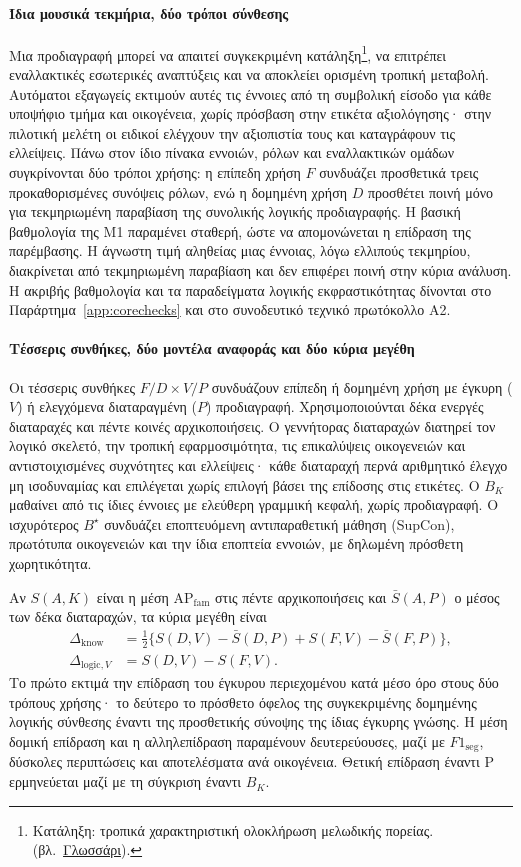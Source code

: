 \documentclass[a4paper]{article}
\newcommand{\musnote}[2]{\footnote{#2\enspace(βλ.~\hyperlink{gl:#1}{Γλωσσάρι}).}}
\begin{document}
\paragraph{Ίδια μουσικά τεκμήρια, δύο τρόποι σύνθεσης}
Μια προδιαγραφή μπορεί να απαιτεί συγκεκριμένη κατάληξη\musnote{cadence}{Κατάληξη: τροπικά χαρακτηριστική ολοκλήρωση μελωδικής πορείας.}, να επιτρέπει εναλλακτικές εσωτερικές αναπτύξεις και να αποκλείει ορισμένη τροπική μεταβολή. Αυτόματοι εξαγωγείς εκτιμούν αυτές τις έννοιες από τη συμβολική είσοδο για κάθε υποψήφιο τμήμα και οικογένεια, χωρίς πρόσβαση στην ετικέτα αξιολόγησης· στην πιλοτική μελέτη οι ειδικοί ελέγχουν την αξιοπιστία τους και καταγράφουν τις ελλείψεις. Πάνω στον ίδιο πίνακα εννοιών, ρόλων και εναλλακτικών ομάδων συγκρίνονται δύο τρόποι χρήσης: η επίπεδη χρήση $F$ συνδυάζει προσθετικά τρεις προκαθορισμένες συνόψεις ρόλων, ενώ η δομημένη χρήση $D$ προσθέτει ποινή μόνο για τεκμηριωμένη παραβίαση της συνολικής λογικής προδιαγραφής. Η βασική βαθμολογία της Μ1 παραμένει σταθερή, ώστε να απομονώνεται η επίδραση της παρέμβασης. Η άγνωστη τιμή αληθείας μιας έννοιας, λόγω ελλιπούς τεκμηρίου, διακρίνεται από τεκμηριωμένη παραβίαση και δεν επιφέρει ποινή στην κύρια ανάλυση. Η ακριβής βαθμολογία και τα παραδείγματα λογικής εκφραστικότητας δίνονται στο Παράρτημα~\ref{app:corechecks} και στο συνοδευτικό τεχνικό πρωτόκολλο Α2.

\paragraph{Τέσσερις συνθήκες, δύο μοντέλα αναφοράς και δύο κύρια μεγέθη}
Οι τέσσερις συνθήκες $F/D\times V/P$ συνδυάζουν επίπεδη ή δομημένη χρήση με έγκυρη ($V$) ή ελεγχόμενα διαταραγμένη ($P$) προδιαγραφή. Χρησιμοποιούνται δέκα ενεργές διαταραχές και πέντε κοινές αρχικοποιήσεις. Ο γεννήτορας διαταραχών διατηρεί τον λογικό σκελετό, την τροπική εφαρμοσιμότητα, τις επικαλύψεις οικογενειών και αντιστοιχισμένες συχνότητες και ελλείψεις· κάθε διαταραχή περνά αριθμητικό έλεγχο μη ισοδυναμίας και επιλέγεται χωρίς επιλογή βάσει της επίδοσης στις ετικέτες. Ο $B_K$ μαθαίνει από τις ίδιες έννοιες με ελεύθερη γραμμική κεφαλή, χωρίς προδιαγραφή. Ο ισχυρότερος $B^\star$ συνδυάζει εποπτευόμενη αντιπαραθετική μάθηση (SupCon), πρωτότυπα οικογενειών και την ίδια εποπτεία εννοιών, με δηλωμένη πρόσθετη χωρητικότητα.

Αν $S(A,K)$ είναι η μέση $\mathrm{AP}_{\mathrm{fam}}$ στις πέντε αρχικοποιήσεις και $\bar S(A,P)$ ο μέσος των δέκα διαταραχών, τα κύρια μεγέθη είναι
\[
\begin{aligned}
\Delta_{\mathrm{know}}&=\tfrac12\{S(D,V)-\bar S(D,P)+S(F,V)-\bar S(F,P)\},\\
\Delta_{\mathrm{logic},V}&=S(D,V)-S(F,V).
\end{aligned}
\]
Το πρώτο εκτιμά την επίδραση του έγκυρου περιεχομένου κατά μέσο όρο στους δύο τρόπους χρήσης· το δεύτερο το πρόσθετο όφελος της συγκεκριμένης δομημένης λογικής σύνθεσης έναντι της προσθετικής σύνοψης της ίδιας έγκυρης γνώσης. Η μέση δομική επίδραση και η αλληλεπίδραση παραμένουν δευτερεύουσες, μαζί με $F1_{\mathrm{seg}}$, δύσκολες περιπτώσεις και αποτελέσματα ανά οικογένεια. Θετική επίδραση έναντι P ερμηνεύεται μαζί με τη σύγκριση έναντι $B_K$.
\end{document}
